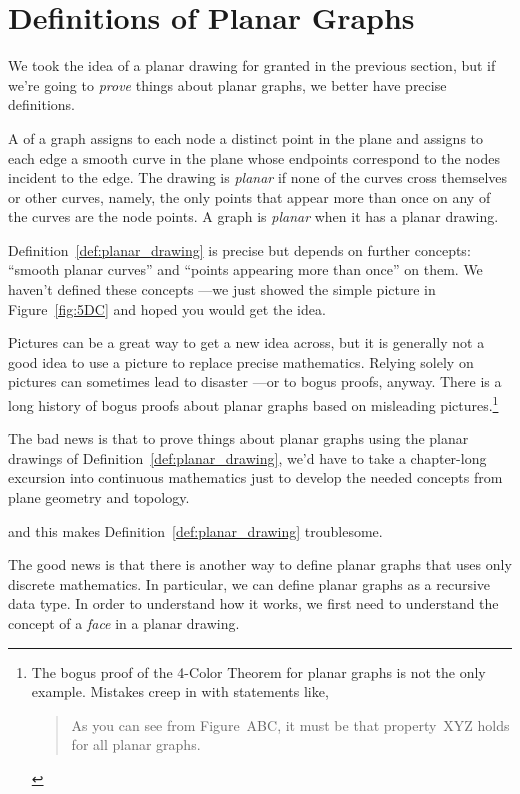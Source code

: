 \section{Definitions of Planar Graphs}\label{sec:recdef_planar}

We took the idea of a planar drawing for granted in the previous
section, but if we're going to \emph{prove} things about planar graphs, we
better have precise definitions.

\begin{definition}\label{def:planar_drawing}
A  of a graph assigns to each node a distinct point in
the plane and assigns to each edge a smooth curve in the plane whose
endpoints correspond to the nodes incident to the edge.  The drawing
is \emph{planar} if none of the curves
cross themselves or other curves, namely, the only points that
appear more than once on any of the curves are the node points.  A
graph is \emph{planar} when it has a planar
drawing.
\end{definition}

Definition~\ref{def:planar_drawing} is precise but depends on
further concepts: ``smooth planar curves'' and ``points appearing more
than once'' on them.  We haven't defined these concepts ---we just
showed the simple picture in Figure~\ref{fig:5DC} and hoped you would
get the idea.

Pictures can be a great way to get a new idea across, but it is generally
not a good idea to use a picture to replace precise mathematics.  Relying
solely on pictures can sometimes lead to disaster ---or to bogus proofs,
anyway.  There is a long history of bogus proofs about planar graphs based
on misleading pictures.\footnote{The bogus proof of the
  4-Color Theorem for planar graphs is not the only example.  Mistakes
  creep in with statements like,
\begin{quote}
    As you can see from Figure~ABC, it must be that property~XYZ holds
    for all planar graphs.
\end{quote}}

The bad news is that to prove things about planar graphs using the
planar drawings of Definition~\ref{def:planar_drawing}, we'd have to
take a chapter-long excursion into continuous mathematics just to
develop the needed concepts from plane geometry and topology.
\begin{editingnotes} and this makes
  Definition~\ref{def:planar_drawing} troublesome.
\end{editingnotes}
The good news is that there is another way to define planar graphs that
uses only discrete mathematics.  In particular, we can define planar
graphs as a recursive data type.  In order to understand how it works, we
first need to understand the concept of a \emph{face} in a planar drawing.

